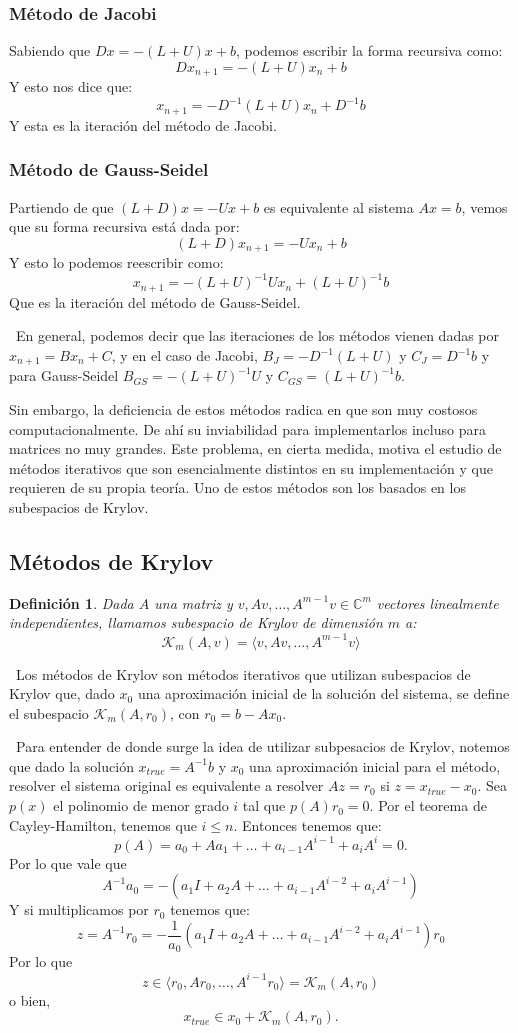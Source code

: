 \documentclass[12pt, oneside]{book}
\newtheorem*{definition}{Definición}
\begin{document}
\subsubsection{Método de Jacobi}
Sabiendo que $Dx=-(L+U)x+b$, podemos escribir la forma recursiva como: $$Dx_{n+1}=-(L+U)x_n+b$$ Y esto nos dice que: $$x_{n+1}=-D^{-1}(L+U)x_n+D^{-1}b$$ Y esta es la iteración del método de Jacobi.
\subsubsection{Método de Gauss-Seidel}
Partiendo de que $(L+D)x=-Ux+b$ es equivalente al sistema $Ax=b$, vemos que su forma recursiva está dada por: $$(L+D)x_{n+1}=-Ux_n+b$$ Y esto lo podemos reescribir como: $$x_{n+1}=-(L+U)^{-1}Ux_n+(L+U)^{-1}b$$ Que es la iteración del método de Gauss-Seidel.

\ En general, podemos decir que las iteraciones de los métodos vienen dadas por $x_{n+1}=Bx_n+C$, y en el caso de Jacobi, $B_J=-D^{-1}(L+U)$ y $C_J=D^{-1}b$ y para Gauss-Seidel $B_{GS}=-(L+U)^{-1}U$ y $C_{GS}=(L+U)^{-1}b$.

Sin embargo, la deficiencia de estos métodos radica en que son muy costosos computacionalmente. De ahí su inviabilidad para implementarlos incluso para matrices no muy grandes. Este problema, en cierta medida, motiva el estudio de métodos iterativos que son esencialmente distintos en su implementación y que requieren de su propia teoría. Uno de estos métodos son los basados en los subespacios de Krylov. 

\subsection{Métodos de Krylov}
\begin{definition}
	Dada $A$ una matriz y $v, Av, \dots , A^{m-1}v \in \mathbb{C}^m$ vectores linealmente independientes, llamamos subespacio de Krylov de dimensión $m$ a: $$\mathcal{K}_{m}(A, v) = \langle v, Av, \ldots, A^{m-1}v \rangle$$
\end{definition} 
\ Los métodos de Krylov son métodos iterativos que utilizan subespacios de Krylov que, dado $x_0$ una aproximación inicial de la solución del sistema, se define el subespacio $\mathcal{K}_{m}(A, r_0)$, con $r_0=b-Ax_0$.

\ Para entender de donde surge la idea de utilizar subpesacios de Krylov, notemos que dado la solución $x_{true}=A^{-1}b$ y $x_0$ una aproximación inicial para el método, resolver el sistema original es equivalente a resolver $Az=r_0$ si $z=x_{true}-x_0$. Sea $p(x)$ el polinomio de menor grado $i$ tal que $p(A)r_0=0$. Por el teorema de Cayley-Hamilton, tenemos que $i\leq n$. Entonces tenemos que: $$p(A)=a_0+Aa_1+\dots+a_{i-1}A^{i-1}+a_iA^i=0.$$ Por lo que vale que $$A^{-1}a_0=-(a_1I+a_2A+\dots+a_{i-1}A^{i-2}+a_iA^{i-1})$$ Y si multiplicamos por $r_0$ tenemos que: $$z=A^{-1}r_0=-\frac{1}{a_0}(a_1I+a_2A+\dots+a_{i-1}A^{i-2}+a_iA^{i-1})r_0$$ Por lo que $$z\in \langle r_0,Ar_0,\dots,A^{i-1}r_0 \rangle = \mathcal{K}_{m}(A, r_0)$$ o bien, $$x_{true} \in x_0 + \mathcal{K}_{m}(A, r_0).$$
\end{document}
